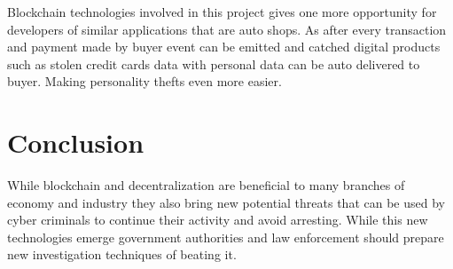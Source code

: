 \documentclass[journal]{IEEEtran} %
\begin{document}
        Blockchain technologies involved in this project gives one more opportunity for developers of similar applications that are auto shops. As after every transaction and payment made by buyer event can be emitted and catched digital products such as stolen credit cards data with personal data can be auto delivered to buyer. Making personality thefts even more easier. 
         
\section{Conclusion}
    While blockchain and decentralization are beneficial to many branches of economy and industry they also bring new potential threats that can be used by cyber criminals to continue their activity and avoid arresting. While this new technologies emerge government authorities and law enforcement should prepare new investigation techniques of beating it.




\end{document}
